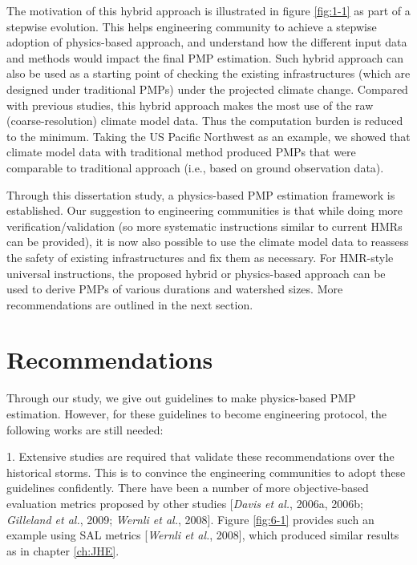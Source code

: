 The motivation of this hybrid approach is illustrated in figure \ref{fig:1-1} as part of a stepwise evolution. This helps engineering community to achieve a stepwise adoption of physics-based approach, and understand how the different input data and methods would impact the final PMP estimation. Such hybrid approach can also be used as a starting point of checking the existing infrastructures (which are designed under traditional PMPs) under the projected climate change. Compared with previous studies, this hybrid approach makes the most use of the raw (coarse-resolution) climate model data. Thus the computation burden is reduced to the minimum. Taking the US Pacific Northwest as an example, we showed that climate model data with traditional method produced PMPs that were comparable to traditional approach (i.e., based on ground observation data).

Through this dissertation study, a physics-based PMP estimation framework is established. Our suggestion to engineering communities is that while doing more verification/validation (so more systematic instructions similar to current HMRs can be provided), it is now also possible to use the climate model data to reassess the safety of existing infrastructures and fix them as necessary. For HMR-style universal instructions, the proposed hybrid or physics-based approach can be used to derive PMPs of various durations and watershed sizes. More recommendations are outlined in the next section.


\section {Recommendations}

Through our study, we give out guidelines to make physics-based PMP estimation. However, for these guidelines to become engineering protocol, the following works are still needed:

1. Extensive studies are required that validate these recommendations over the historical storms. This is to convince the engineering communities to adopt these guidelines confidently. There have been a number of more objective-based evaluation metrics proposed by other studies [\textit{Davis et al.}, 2006a, 2006b; \textit{Gilleland et al.}, 2009; \textit{Wernli et al.}, 2008]. Figure \ref{fig:6-1} provides such an example using SAL metrics [\textit{Wernli et al.}, 2008], which produced similar results as in chapter \ref{ch:JHE}.

